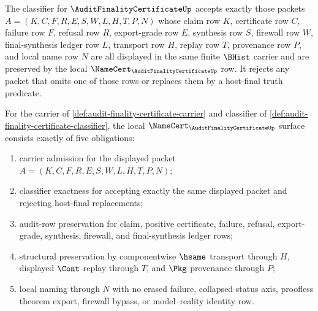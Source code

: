 \begin{definition}
\label{def:audit-finality-certificate-classifier}
The classifier for $\AuditFinalityCertificateUp$ accepts exactly those packets $A=(K,C,F,R,E,S,W,L,H,T,P,N)$ whose claim row $K$, certificate row $C$, failure row $F$, refusal row $R$, export-grade row $E$, synthesis row $S$, firewall row $W$, final-synthesis ledger row $L$, transport row $H$, replay row $T$, provenance row $P$, and local name row $N$ are all displayed in the same finite $\BHist$ carrier and are preserved by the local $\NameCert_{\AuditFinalityCertificateUp}$ row. It rejects any packet that omits one of those rows or replaces them by a host-final truth predicate.
\end{definition}

\begin{theorem}
\label{thm:audit-finality-certificate-namecert-obligations}
For the carrier of \autoref{def:audit-finality-certificate-carrier} and classifier of \autoref{def:audit-finality-certificate-classifier}, the local $\NameCert_{\AuditFinalityCertificateUp}$ surface consists exactly of five obligations:
\begin{enumerate}
\item carrier admission for the displayed packet $A=(K,C,F,R,E,S,W,L,H,T,P,N)$;
\item classifier exactness for accepting exactly the same displayed packet and rejecting host-final replacements;
\item audit-row preservation for claim, positive certificate, failure, refusal, export-grade, synthesis, firewall, and final-synthesis ledger rows;
\item structural preservation by componentwise $\hsame$ transport through $H$, displayed $\Cont$ replay through $T$, and $\Pkg$ provenance through $P$;
\item local naming through $N$ with no erased failure, collapsed status axis, proofless theorem export, firewall bypass, or model--reality identity row.
\end{enumerate}
\end{theorem}
